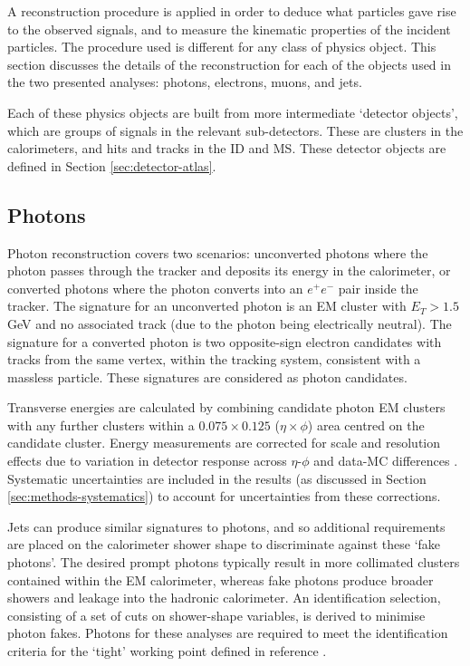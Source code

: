
A reconstruction procedure is applied in order to
deduce what particles gave rise to the observed signals,
and to measure the
kinematic properties of the incident particles.
The procedure used is different for any class of physics object. This section
discusses the details of the reconstruction for each of the objects used in the
two presented analyses: photons, electrons, muons, and jets.

Each of these physics objects are built from more intermediate `detector
objects', which are groups of signals in the relevant sub-detectors. These are
clusters in the calorimeters, and hits and tracks in the
\ac{ID} and \ac{MS}. These detector objects are defined in Section
\ref{sec:detector-atlas}.

\subsection{Photons}
\label{sec:methods-reconsruction-photon}

Photon reconstruction covers two scenarios: unconverted photons where the photon
passes through the tracker and deposits its energy in the calorimeter, or
converted photons where the photon converts into an $e^+e^-$ pair inside the
tracker.
The signature for an unconverted photon is an \ac{EM} cluster with $E_T > 1.5$
GeV and no associated
track (due to the photon being electrically neutral). The signature for a
converted photon is two opposite-sign electron candidates with tracks from the
same vertex, within the tracking system, consistent with a massless particle.
These signatures are considered as photon candidates.

Transverse energies are calculated by combining candidate photon \ac{EM}
clusters with any further clusters within a $0.075\times0.125$
($\eta\times\phi$) area centred on the candidate cluster. Energy measurements
are corrected for scale and resolution effects due to variation in detector
response across $\eta$-$\phi$ and data-\ac{MC} differences
\cite{EGamCalibration2019}. Systematic uncertainties are included in the results
(as discussed in Section \ref{sec:methods-systematics}) to account for
uncertainties from these corrections.

Jets can produce similar signatures to photons, and so additional
requirements are placed on the calorimeter shower shape to discriminate against
these `fake photons'. The desired prompt photons typically result in more
collimated clusters contained within the \ac{EM} calorimeter, whereas fake
photons produce broader showers and leakage into the hadronic calorimeter.
An identification selection, consisting of a set of cuts on shower-shape
variables, is derived to minimise photon fakes. Photons for these analyses are
required to meet the identification criteria for the `tight' working point
defined in reference \cite{ATLASegamPerf2019}.

